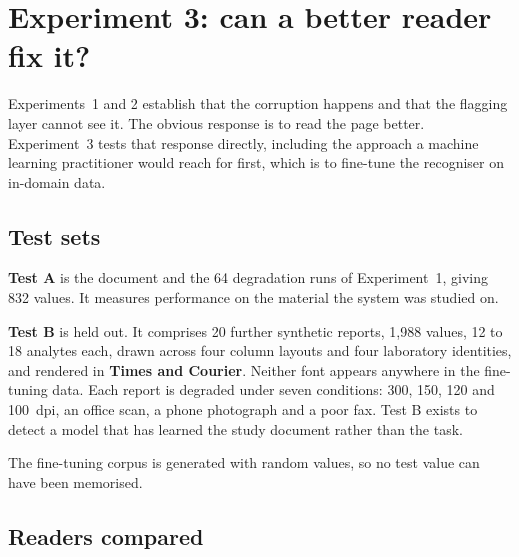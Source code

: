 \documentclass[11pt]{article}
\begin{document}
\section{Experiment 3: can a better reader fix it?}

Experiments~1 and 2 establish that the corruption happens and that the flagging layer cannot
see it. The obvious response is to read the page better. Experiment~3 tests that response
directly, including the approach a machine learning practitioner would reach for first, which is
to fine-tune the recogniser on in-domain data.

\subsection{Test sets}

\textbf{Test A} is the document and the 64 degradation runs of Experiment~1, giving 832 values.
It measures performance on the material the system was studied on.

\noindent \textbf{Test B} is held out. It comprises 20 further synthetic reports, 1{,}988 values, 12 to 18
analytes each, drawn across four column layouts and four laboratory identities, and rendered in
\textbf{Times and Courier}. Neither font appears anywhere in the fine-tuning data. Each report
is degraded under seven conditions: 300, 150, 120 and 100~dpi, an office scan, a phone
photograph and a poor fax. Test B exists to detect a model that has learned the study document
rather than the task.

The fine-tuning corpus is generated with random values, so no test value can have been
memorised.

\subsection{Readers compared}
\end{document}
